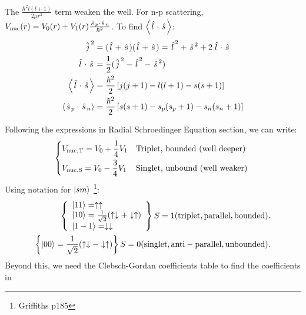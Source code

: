 \documentclass{school-22.101-notes}
\begin{document}
The $\frac{\hbar^2 l(l+1)}{2 \mu r^2}$ term weaken the well. For n-p scattering, $V_{\mathrm{nuc}} (r) = V_0 (r) + V_1 (r) \frac{\left. \hat{s} \right._p \cdot \left. \hat{s} \right._n}{\hbar^2}$. 
To find $\left< \left. \hat{l} \right. \cdot \left. \hat{s} \right. \right>$: 
\begin{align}
\left. \hat{j} \right.^2 &= (\left. \hat{l} \right. + \left. \hat{s} \right.)(\left. \hat{l} \right. + \left. \hat{s} \right.) = \left. \hat{l} \right.^2 + \left. \hat{s} \right.^2 + 2 \left. \hat{l} \right. \cdot \left. \hat{s} \right. \\ 
\left. \hat{l} \right. \cdot \left. \hat{s} \right. &= \frac{1}{2} (\left. \hat{j} \right.^2 - \left. \hat{l} \right.^2 - \left. \hat{s} \right.^2 ) \\
\left<  \left. \hat{l} \right. \cdot \left. \hat{s} \right. \right> &= \frac{\hbar^2}{2} \left[ j(j+1) - l(l+1) - s(s+1) \right] \\
\left<  \left. \hat{s} \right._p \cdot \left. \hat{s} \right._n \right> &= \frac{\hbar^2}{2} \left[ s(s+1) - s_p(s_p+1) - s_n(s_n+1) \right] 
\end{align}

Following the expressions in Radial Schroedinger Equation section, we can write: 
\begin{align}
\begin{dcases*}
V_{\mathrm{nuc,T}} = V_0 + \frac{1}{4} V_1 & Triplet, bounded (well deeper) \\
V_{\mathrm{nuc,S}} = V_0 - \frac{3}{4} V_1 & Singlet, unbound (well weaker)
\end{dcases*}
\end{align}
Using notation for $\left| s m \right>$ \footnote{Griffiths p185}: 
\begin{align}
\left\{ \begin{array}{l} 
\left| 1 1 \right> = \uparrow \uparrow \\
\left| 1 0 \right> = \frac{1}{\sqrt{2}} (\uparrow \downarrow + \downarrow \uparrow ) \\
\left| 1 -1 \right> = \downarrow \downarrow
\end{array} \right\}
S = 1 (\mathrm{triplet, parallel, bounded}). \\
\left\{ \left| 0 0 \right> = \frac{1}{\sqrt{2}} (\uparrow \downarrow - \downarrow \uparrow ) \right\} 
S = 0 (\mathrm{singlet, anti-parallel, unbounded}).
\end{align}
Beyond this, we need the Clebsch-Gordan coefficients table to find the coefficients in 
\end{document}
